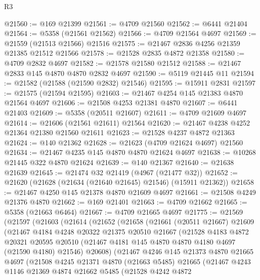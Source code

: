\begin{lexlean}{R3}
\begin{coremodule}
@21560 := @169 @21399
@21561 := @4709 @21560
@21562 := @6441 @21404
@21564 := @5358 (@21561 @21562)
@21566 := @4709 @21564 @4697
@21569 := @21559 (@21513 @21566) @21516
@21575 := @21467 @2836 @4256 @21359 @21385 @21512 @21566
@21578 := @21528 @2835 @4872 @21358
@21580 := @4709 @2832 @4697
@21582 := @21578 @21580 @21512
@21588 := @21467 @2833 @145 @4870 @4870 @2832 @4697
@21590 := @5119 @21445 @11
@21594 := @21582 (@21588 (@21590 @2832) @21546)
@21595 := @15911 @2831
@21597 := @21575 (@21594 @21595)
@21603 := @21467 @4254 @145 @21383 @4870 @21564 @4697
@21606 := @21508 @4253 @21381 @4870
@21607 := @6441 @21403
@21609 := @5358 (@20511 @21607)
@21611 := @4709 @21609 @4697
@21614 := @21606 (@21561 @21611) @21564
@21620 := @21467 @4238 @4252 @21364 @21380 @21560 @21611
@21623 := @21528 @4237 @4872 @21363
@21624 := @140 @21362
@21628 := @21623 (@4709 @21624 @4697) @21560
@21634 := @21467 @4235 @145 @4870 @4870 @21624 @4697
@21638 := @10268 @21445 @322 @4870 @21624
@21639 := @140 @21367
@21640 := @21638 @21639
@21645 := @21474 @32 @21419 (@4967 (@21477 @32))
@21652 := @21620 (@21628 (@21634 (@21640 @21645) @21546) (@15911 @21362))
@21658 := @21467 @4250 @145 @21378 @4870 @21609 @4697
@21661 := @21508 @4249 @21376 @4870
@21662 := @169 @21401
@21663 := @4709 @21662
@21665 := @5358 (@21663 @6464)
@21667 := @4709 @21665 @4697
@21775 := @21569
    (@21597
      (@21603
        (@21614
          (@21652
            (@21658
              (@21661
                (@20511 @21667)
                @21609
                (@21467
                  @4184
                  @4248
                  @20322
                  @21375
                  @20510
                  @21667
                  (@21528
                    @4183
                    @4872
                    @20321
                    @20595
                    @20510
                    (@21467 @4181 @145 @4870 @4870 @4180 @4697 (@21590 @4180) @21546)
                    @20608)
                  (@21467
                    @4246
                    @145
                    @21373
                    @4870
                    @21665
                    @4697
                    (@21508
                      @4245
                      @21371
                      @4870
                      (@21663 @5485)
                      @21665
                      (@21467
                        @4243
                        @1146
                        @21369
                        @4874
                        @21662
                        @5485
                        (@21528
                          @4242
                          @4872

\end{coremodule}
\end{lexlean}
